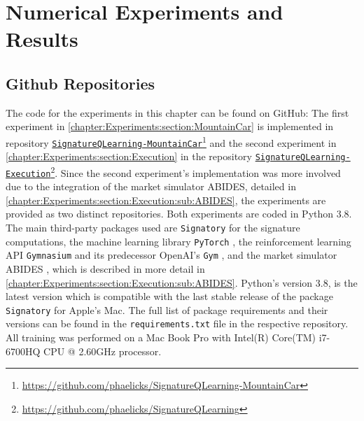 \documentclass[
    a4paper,
    11pt,
    bibliography=totoc,
    listof=totoc,      
    headinclude=true,
    cleardoublepage=empty,
]{scrbook}
\theoremstyle{plain}
\theoremstyle{definition}
\theoremstyle{remark}
\begin{document}
\chapter{Numerical Experiments and Results} 
\label{chapter:Experiments}

\section{Github Repositories}
\label{chapter:Experiments:section:Github}

The code for the experiments in this chapter can be found on GitHub: The first experiment in \cref{chapter:Experiments:section:MountainCar} is implemented in repository 
\href{https://github.com/phaelicks/SignatureQLearning-MountainCar}{
    \texttt{SignatureQLearning-MountainCar}}\footnote{
    \url{https://github.com/phaelicks/SignatureQLearning-MountainCar}
} 
and the second experiment in \cref{chapter:Experiments:section:Execution} in the repository 
\href{https://github.com/phaelicks/SignatureQLearning}{
    \texttt{SignatureQLearning-Execution}}\footnote{
    \url{https://github.com/phaelicks/SignatureQLearning}
}.
Since the second experiment's implementation was more involved due to the
integration of the market simulator ABIDES, detailed in
\cref{chapter:Experiments:section:Execution:sub:ABIDES}, the experiments are
provided as two distinct repositories. Both experiments are coded in Python
3.8. The main third-party packages used are \texttt{Signatory}
\cite{kidger2021_sdcsltb} for the signature computations, the machine learning
library \texttt{PyTorch} \cite{paszke2017_adp}, the reinforcement learning API
\texttt{Gymnasium} \cite{towers2023_gv0} and its predecessor OpenAI's
\texttt{Gym} \cite{brockman2016_og}, and the market simulator ABIDES
\cite{byrd2020_athmms}, which is described in more detail in
\cref{chapter:Experiments:section:Execution:sub:ABIDES}. Python's version 3.8,
is the latest version which is compatible with the last stable release of the
package \texttt{Signatory} for Apple's Mac. The full list of package
requirements and their versions can be found in the \texttt{requirements.txt}
file in the respective repository. All training was performed on a Mac Book
Pro with Intel(R) Core(TM) i7-6700HQ CPU @ 2.60GHz processor. 
\end{document}
